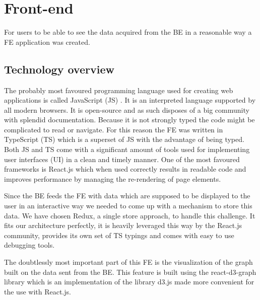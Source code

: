 \section{Front-end}
For users to be able to see the data acquired from the BE in a reasonable way a FE application was created. 
\subsection{Technology overview}
The probably most favoured programming language used for creating web applications \cite{jsGithut} is called JavaScript (JS) \cite{javaScript}. It is an interpreted language supported by all modern browsers. It is open-source and as such disposes of a big community with splendid documentation. Because it is not strongly typed the code might be complicated to read or navigate. For this reason the FE was written in TypeScript (TS) \cite{typeScript} which is a superset of JS with the advantage of being typed. Both JS and TS come with a significant amount of tools used for implementing user interfaces (UI) in a clean and timely manner. One of the most favoured frameworks is React.js \cite{react} which when used correctly results in readable code and improves performance by managing the re-rendering of page elements.

Since the BE feeds the FE with data which are supposed to be displayed to the user in an interactive way we needed to come up with a mechanism to store this data. We have chosen Redux, a single store approach, to handle this challenge. It fits our architecture perfectly, it is heavily leveraged this way by the React.js community, provides its own set of TS typings and comes with easy to use debugging tools.

The doubtlessly most important part of this FE is the visualization of the graph built on the data sent from the BE. This feature is built using the react-d3-graph library \cite{reactD3Graph} which is 
an implementation of the library d3.js \cite{d3} made more convenient for the use with React.js. 

